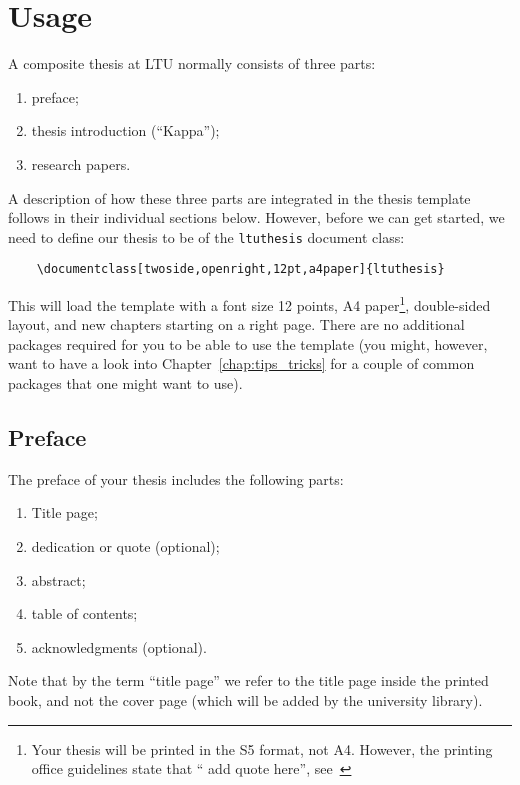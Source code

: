 \chapter{Usage}
\label{chap:usage}
A composite thesis at LTU normally consists of three parts:
%
\begin{enumerate}
    \item preface;
    \item thesis introduction (``Kappa'');
    \item research papers.
\end{enumerate}
%
A description of how these three parts are integrated in the thesis template follows in their individual sections below. However, before we can get started, we need to define our thesis to be of the \texttt{ltuthesis} document class:
%
\begin{lstlisting}
    \documentclass[twoside,openright,12pt,a4paper]{ltuthesis}
\end{lstlisting}
%
This will load the template with a font size 12 points, A4 paper\footnote{Your thesis will be printed in the S5 format, not A4. However, the printing office guidelines state that ``{\color{red} add quote here}'', see~\cite{blabla}}, double-sided layout, and new chapters starting on a right page. There are no additional packages required for you to be able to use the template (you might, however, want to have a look into Chapter~\ref{chap:tips_tricks} for a couple of common packages that one might want to use).


\section{Preface}
\label{sec:usage:preface}
The preface of your thesis includes the following parts:
%
\begin{enumerate}
    \item Title page;
    \item dedication or quote (optional);
    \item abstract;
    \item table of contents;
    \item acknowledgments (optional).
\end{enumerate}
%
Note that by the term ``title page'' we refer to the title page inside the printed book, and not the cover page (which will be added by the university library).

